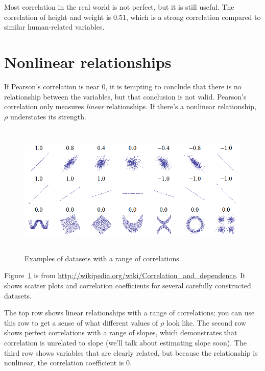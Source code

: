 \documentclass[12pt]{book}
\begin{document}
Most correlation in the real world is not perfect, but it is still
useful.  The correlation of height and weight is 0.51, which is a
strong correlation compared to similar human-related variables.


\section{Nonlinear relationships}

If Pearson's correlation is near 0, it is tempting to conclude
that there is no relationship between the variables, but that
conclusion is not valid.  Pearson's correlation only measures {\em
  linear} relationships.  If there's a nonlinear relationship, $\rho$
understates its strength.  

\begin{figure}
\centerline{\includegraphics[height=2.5in]{figs/Correlation_examples.png}}
\caption{Examples of datasets with a range of correlations.}
\label{corr_examples}
\end{figure}

Figure~\ref{corr_examples} is from
\url{http://wikipedia.org/wiki/Correlation_and_dependence}.  It shows
scatter plots and correlation coefficients for several
carefully constructed datasets.

The top row shows linear relationships with a range of correlations;
you can use this row to get a sense of what different values of
$\rho$ look like.  The second row shows perfect correlations with a
range of slopes, which demonstrates that correlation is unrelated to
slope (we'll talk about estimating slope soon).  The third row shows
variables that are clearly related, but because the relationship is
nonlinear, the correlation coefficient is 0.
\end{document}
